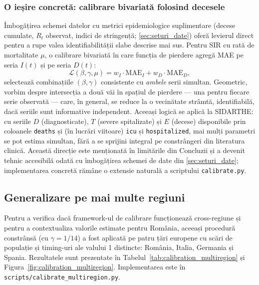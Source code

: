\subsubsection*{O ieșire concretă: calibrare bivariată folosind decesele}

Îmbogățirea schemei datelor cu metrici epidemiologice suplimentare
(decese cumulate, $R_t$ observat, indici de stringență; \cref{sec:seturi_date})
oferă levierul direct pentru a rupe valea identifiabilității slabe descrise mai
sus. Pentru SIR cu rată de mortalitate $\mu$, o calibrare bivariată în care
funcția de pierdere agregă MAE pe seria $I(t)$ și pe seria $D(t)$:
\begin{equation}
\label{eq:loss_bivariate}
\mathcal{L}(\beta, \gamma, \mu) = w_I \cdot \mathrm{MAE}_I + w_D \cdot \mathrm{MAE}_D,
\end{equation}
selectează combinațiile $(\beta, \gamma)$ consistente cu \emph{ambele} serii
simultan. Geometric, vorbim despre intersecția a două văi în spațiul de
pierdere — una pentru fiecare serie observată — care, în general, se reduce
la o vecinătate strâmtă, identifiabilă, dacă seriile sunt informative
independent. Aceeași logică se aplică la SIDARTHE: cu seriile $D$
(diagnosticate), $T$ (severe spitalizate) și $E$ (decese) disponibile prin
coloanele \texttt{deaths} și (în lucrări viitoare) \texttt{icu} și
\texttt{hospitalized}, mai mulți parametri se pot estima simultan,
fără a se sprijini integral pe constrângeri din literatura clinică.
Această direcție este menționată în limitările din Concluzii
și a devenit tehnic accesibilă odată cu îmbogățirea schemei de date din
\cref{sec:seturi_date}; implementarea concretă rămâne o extensie naturală a
scriptului \texttt{calibrate.py}.

\subsection{Generalizare pe mai multe regiuni}
\label{subsec:calibrare_multiregion}

Pentru a verifica dacă framework-ul de calibrare funcționează cross-regiune
și pentru a contextualiza valorile estimate pentru România, aceeași procedură
constrânsă (cu $\gamma = 1/14$) a fost aplicată pe patru țări europene cu
scări de populație și timing-uri ale valului 1 distincte:
România, Italia, Germania și Spania. Rezultatele sunt prezentate în
Tabelul~\ref{tab:calibration_multiregion} și Figura~\ref{fig:calibration_multiregion}.
Implementarea este în \texttt{scripts/calibrate\_multiregion.py}.

